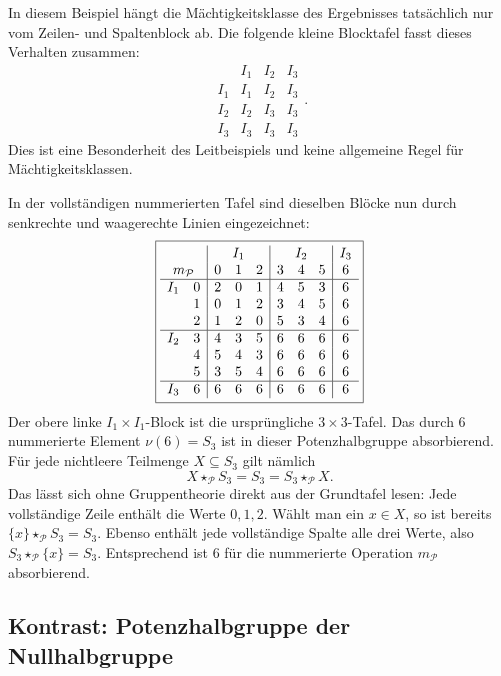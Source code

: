 \documentclass[main.tex]{subfiles}
\begin{document}
In diesem Beispiel hängt die Mächtigkeitsklasse des Ergebnisses tatsächlich
nur vom Zeilen- und Spaltenblock ab.  Die folgende kleine Blocktafel fasst
dieses Verhalten zusammen:
\[
\begin{array}{c|ccc}
&I_1&I_2&I_3\\\hline
I_1&I_1&I_2&I_3\\
I_2&I_2&I_3&I_3\\
I_3&I_3&I_3&I_3
\end{array}.
\]
Dies ist eine Besonderheit des Leitbeispiels und keine allgemeine Regel für
Mächtigkeitsklassen.

In der vollständigen nummerierten Tafel sind dieselben Blöcke nun durch
senkrechte und waagerechte Linien eingezeichnet:
\[
\boxed{
\begin{array}{cc|ccc|ccc|c}
\multicolumn{2}{c|}{}
  &\multicolumn{3}{c|}{I_1}
  &\multicolumn{3}{c|}{I_2}
  &\multicolumn{1}{c}{I_3}\\
\multicolumn{2}{c|}{m_{\mathcal P}}
  &0&1&2&3&4&5&6\\\hline
I_1&0&2&0&1&4&5&3&6\\
   &1&0&1&2&3&4&5&6\\
   &2&1&2&0&5&3&4&6\\\hline
I_2&3&4&3&5&6&6&6&6\\
   &4&5&4&3&6&6&6&6\\
   &5&3&5&4&6&6&6&6\\\hline
I_3&6&6&6&6&6&6&6&6
\end{array}}
\]
Der obere linke \(I_1\times I_1\)-Block ist die ursprüngliche
\(3\times3\)-Tafel.  Das durch \(6\) nummerierte Element
\(\nu(6)=S_3\) ist in dieser Potenzhalbgruppe absorbierend.  Für jede
nichtleere Teilmenge \(X\subseteq S_3\) gilt nämlich
\[
  X\star_{\mathcal P}S_3
  =
  S_3
  =
  S_3\star_{\mathcal P}X.
\]
Das lässt sich ohne Gruppentheorie direkt aus der Grundtafel lesen: Jede
vollständige Zeile enthält die Werte \(0,1,2\).  Wählt man ein
\(x\in X\), so ist bereits
\(\{x\}\star_{\mathcal P}S_3=S_3\).  Ebenso enthält jede vollständige
Spalte alle drei Werte, also
\(S_3\star_{\mathcal P}\{x\}=S_3\).
Entsprechend ist \(6\) für die nummerierte Operation \(m_{\mathcal P}\)
absorbierend.


\subsection{Kontrast: Potenzhalbgruppe der Nullhalbgruppe}
\end{document}
